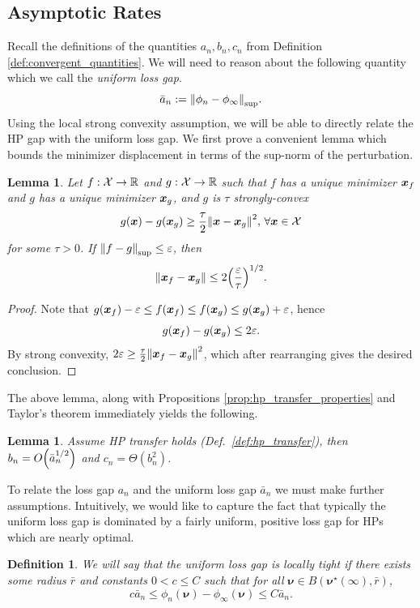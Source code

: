 \documentclass{article} %
\newtheorem{lemma}[theorem]{Lemma}
\newtheorem{definition}{Definition}
\newcommand{\bhp}{\bm{\nu}}                       %
\newcommand{\searchspace}{\mathcal{X}}            %
\newcommand{\growthconst}{\tau}
\newcommand{\supnorm}[1]{\norm{#1}_{\mathrm{sup}}}
\begin{document}
\subsection{Asymptotic Rates}\label{app:asymptotic_rates}
Recall the definitions of the quantities $a_n, b_n, c_n$ from Definition \ref{def:convergent_quantities}. We will need to reason about the following quantity which we call the \textit{uniform loss gap}.
\begin{equation}\label{eq:uniform_loss_gap}
    \bar{a}_n := \supnorm{\phi_n - \phi_\infty}. 
\end{equation}
Using the local strong convexity assumption, we will be able to directly relate the HP gap with the uniform loss gap. We first prove a convenient lemma which bounds the minimizer displacement in terms of the sup-norm of the perturbation.
\begin{lemma}\label{lem:sc_unif_perturb}
    Let $f: \searchspace \to \R$ and $g: \searchspace \to \R$ such that $f$ has a unique minimizer ${\boldsymbol x}_f$ and $g$ has a unique minimizer ${\boldsymbol x}_g$, and $g$ is $\growthconst$ strongly-convex
    \[
        g(\bx) - g(\bx_g) \geq \frac{\growthconst}{2} \norm{\bx - \bx_g}^2,\, \forall \bx \in \searchspace
    \]
    for some $\growthconst > 0$. If $\supnorm{f - g} \leq \varepsilon$, then
    \[
        \norm{\bx_f - \bx_g} \leq 2 \qty(\frac{\varepsilon}{\growthconst})^{1 / 2}.
    \]
\end{lemma}
\begin{proof}
    Note that $g({\boldsymbol x}_f) - \varepsilon \leq f({\boldsymbol x}_f) \leq f({\boldsymbol x}_g) \leq g({\boldsymbol x}_g) + \varepsilon$, hence
    \[
        g({\boldsymbol x}_f) - g({\boldsymbol x}_g) \leq 2 \varepsilon.
    \]
    By strong convexity, $2 \varepsilon \geq \frac{\growthconst}{2} \norm{\bx_f-\bx_g}^2$, which after rearranging gives the desired conclusion.
\end{proof}
The above lemma, along with Propositions \ref{prop:hp_transfer_properties} and Taylor's theorem immediately yields the following.
\begin{lemma}\label{lem:basic_rate_unif}
    Assume HP transfer holds (Def.\ \ref{def:hp_transfer}), then $b_n = O\qty(\bar{a}_n^{1 / 2})$ and $c_n = \Theta(b_n^2)$.
\end{lemma}
To relate the loss gap $a_n$ and the uniform loss gap $\bar{a}_n$ we must make further assumptions. Intuitively, we would like to capture the fact that typically the uniform loss gap is dominated by a fairly uniform, positive loss gap for HPs which are nearly optimal.
\begin{definition}\label{def:locally_tight}
    We will say that the uniform loss gap is locally tight if there exists some radius $\bar{r}$ and constants $0 < c \leq C$ such that for all $\bhp \in B(\bhp^\star(\infty), \bar{r})$, 
\[
    c \bar{a}_n \leq \phi_n(\bhp) - \phi_\infty(\bhp) \leq C \bar{a}_n.
\]
\end{definition}
\end{document}
